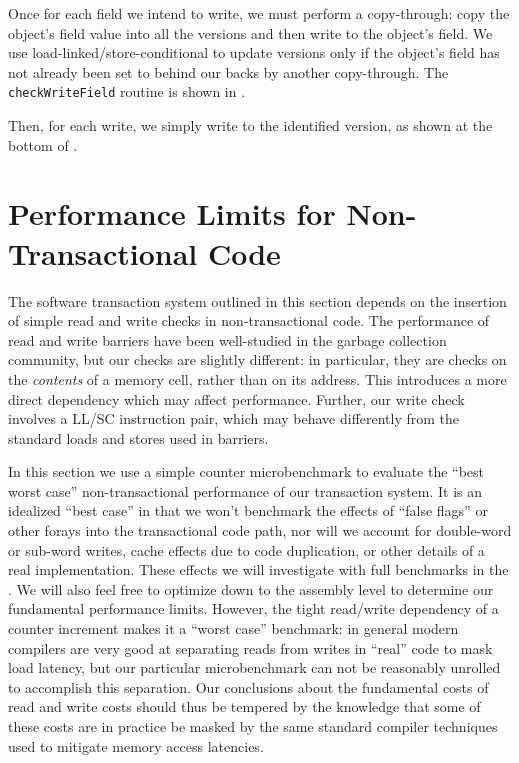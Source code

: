 Once for each field we intend to write, we must perform a
copy-through: copy the object's field value into all the versions and
then write \FLAG to the object's field.  We use
load-linked/store-conditional to update versions only if the object's
field has not already been set to \FLAG behind our backs by another
copy-through.  The {\tt checkWriteField} routine is shown in
.

Then, for each write, we simply write to the identified version, as
shown at the bottom of .

\section{Performance Limits for Non-Transactional Code}
The software transaction system outlined in this section depends on
the insertion of simple read and write checks in non-transactional
code.  The performance of read and write barriers have been
well-studied in the garbage collection community, but our checks are
slightly different: in particular, they are checks on the
\textit{contents} of a memory cell, rather than on its address.  This
introduces a more direct dependency which may affect performance.
Further, our write check involves a LL/SC instruction pair, which may
behave differently from the standard loads and stores used in
barriers.

In this section we use a simple counter microbenchmark to evaluate the
``best worst case'' non-transactional performance of our transaction
system.  It is an idealized ``best case'' in that we won't benchmark
the effects of ``false flags'' or other forays into the transactional
code path, nor will we account for double-word or sub-word writes,
cache effects due to code duplication, or other details of a real
implementation.  These effects we will investigate with full
benchmarks in the .  We will also feel free to
optimize down to the assembly level to determine our fundamental
performance limits.  However, the tight read/write dependency of a
counter increment makes it a ``worst case'' benchmark: in general
modern compilers are very good at separating reads from writes in
``real'' code to mask load latency, but our particular microbenchmark
can not be reasonably unrolled to accomplish this separation.  Our
conclusions about the fundamental costs of read and write costs should
thus be tempered by the knowledge that some of these costs are in
practice be masked by the same standard compiler techniques used to
mitigate memory access latencies.


